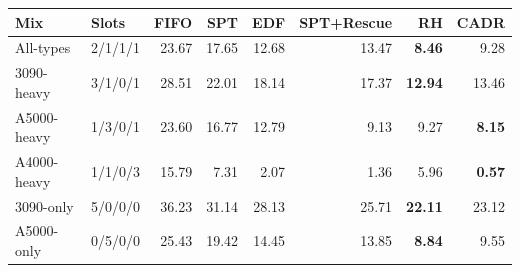 \begin{tabular}{llrrrrrr}
\toprule
\textbf{Mix} & \textbf{Slots} & \textbf{FIFO} & \textbf{SPT} & \textbf{EDF} & \textbf{SPT+Rescue} & \textbf{RH} & \textbf{CADR} \\
\midrule
All-types & 2/1/1/1 & 23.67 & 17.65 & 12.68 & 13.47 & \textbf{8.46} & 9.28 \\
3090-heavy & 3/1/0/1 & 28.51 & 22.01 & 18.14 & 17.37 & \textbf{12.94} & 13.46 \\
A5000-heavy & 1/3/0/1 & 23.60 & 16.77 & 12.79 & 9.13 & 9.27 & \textbf{8.15} \\
A4000-heavy & 1/1/0/3 & 15.79 & 7.31 & 2.07 & 1.36 & 5.96 & \textbf{0.57} \\
3090-only & 5/0/0/0 & 36.23 & 31.14 & 28.13 & 25.71 & \textbf{22.11} & 23.12 \\
A5000-only & 0/5/0/0 & 25.43 & 19.42 & 14.45 & 13.85 & \textbf{8.84} & 9.55 \\
\bottomrule
\end{tabular}
